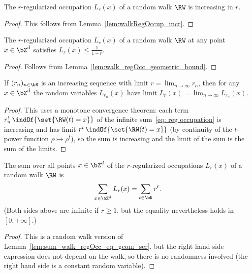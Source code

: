 \begin{lemma}
  \label{lem:regularized_occupation_incr}
  \leanok
  The $r$-regularized occupation $L_r(x)$
  of a random walk $\RW$ is increasing in $r$.
\end{lemma}
\begin{proof}
  \leanok
  This follows from Lemma~\ref{lem:walkRegOccup_incr}.
\end{proof}

\begin{lemma}
  \label{lem:regularized_occupation_geometric_bound}
  \leanok
  The $r$-regularized occupation $L_r(x)$
  of a random walk $\RW$ at any point $x \in \bZ^d$
  satisfies $L_r(x) \le \frac{1}{1-r}$.
\end{lemma}
\begin{proof}
  \leanok
  Follows from Lemma~\ref{lem:walk_regOcc_geometric_bound}.
\end{proof}

\begin{lemma}
  \label{lem:regularized_occupation_left_cont}
  \leanok
  If $(r_n)_{n \in \bN}$ is an increasing sequence with
  limit $r = \lim_{n \to \infty} r_n$, then
  for any $x \in \bZ^d$ the random variables $L_{r_n}(x)$
  have limit $L_{r}(x) = \lim_{n \to \infty} L_{r_n}(x)$.
\end{lemma}
\begin{proof}
  \leanok
  This uses a monotone convergence theorem:
  each term $r_n^t \, \indOf{\set{\RW(t) = x}}$ of the infinite
  sum~\eqref{eq: reg occupation} is increasing and has
  limit $r^t \, \indOf{\set{\RW(t) = x}}$ (by continuity of the
  $t$-power function $\rho \mapsto \rho^t$), so the sum is
  increasing and the limit of the sum is the sum of the limits.
\end{proof}

\begin{lemma}
  \label{lem:sum_regularized_occupation_eq_geom_ser}
  \leanok
  The sum over all points $x \in \bZ^d$ of the $r$-regularized
  occupations $L_r(x)$ of a random walk $\RW$ is
  \begin{align*}
    \sum_{x \in \bZ^d} L_r(x) = \sum_{t \in \bN} r^t .
  \end{align*}
  (Both sides above are infinite if $r \ge 1$, but the equality
  nevertheless holds in $[0,+\infty]$.)
\end{lemma}
\begin{proof}
  \leanok
  This is a random walk version of Lemma~\ref{lem:sum_walk_regOcc_eq_geom_ser},
  but the right hand side expression does not depend on the walk, so there
  is no randomness involved (the right hand side is a constant random variable).
\end{proof}

